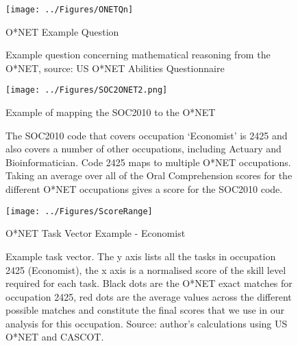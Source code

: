 \documentclass[11pt, oneside]{article}
\begin{document}
	\begin{figure}[t]
		\centering
		\texttt{[image: ../Figures/ONETQn]}
		\caption{O*NET Example Question}
		\caption*{\small{Example question concerning mathematical reasoning from the O*NET, source: US O*NET Abilities Questionnaire}}
		\label{fig:ONETQn}
	\end{figure}
	
	\begin{figure}[h]
		\begin{center}
			\texttt{[image: ../Figures/SOC2ONET2.png]}
			\caption{Example of mapping the SOC2010 to the O*NET }
			\caption*{\small{The SOC2010 code that covers occupation `Economist' is 2425 and also covers a number of other occupations, including Actuary and Bioinformatician. Code 2425 maps to multiple O*NET occupations. Taking an average over all of the Oral Comprehension scores for the different O*NET occupations gives a score for the SOC2010 code. }}
			\label{fig:SOC2ONET}
		\end{center}
	\end{figure}
	
	
	\begin{figure}[h!]
		\centering
		\texttt{[image: ../Figures/ScoreRange]}
		\caption{O*NET Task Vector Example - Economist}
		\caption*{\small{Example task vector. The y axis lists all the tasks in occupation 2425 (Economist), the x axis is a normalised score of the skill level required for each task. Black dots are the O*NET exact matches for occupation 2425, red dots are the average values across the different possible matches and constitute the final scores that we use in our analysis for this occupation. Source: author's calculations using US O*NET and CASCOT.}}
		\label{fig:ONETScoreRange}
	\end{figure}
	
\end{document}
